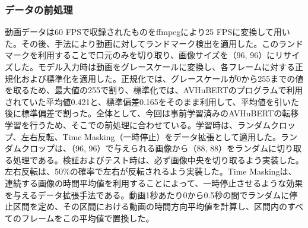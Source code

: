 \documentclass[12pt]{jarticle}
\numberwithin{equation}{section}    %
\numberwithin{figure}{section}      %
\numberwithin{table}{section}      %
\begin{document}
\begin{table}[bt]
    \centering
    \caption{利用したデータセットの文章数}
    \label{sec4:tab:dataset_info}
    \begin{center}
        \renewcommand{\arraystretch}{0.9} %
        \setlength{\tabcolsep}{8pt}      %
    \end{center}
\end{table}

\subsubsection{データの前処理}
動画データは60 FPSで収録されたものをffmpegにより25 FPSに変換して用いた。その後、手法\cite{bulat2017far}により動画に対してランドマーク検出を適用した。このランドマークを利用することで口元のみを切り取り、画像サイズを（96, 96）にリサイズした。モデル入力時は動画をグレースケールに変換し、各フレームに対する正規化および標準化を適用した。正規化では、グレースケールが0から255までの値を取るため、最大値の255で割り、標準化では、AVHuBERTのプログラムで利用されていた平均値0.421と、標準偏差0.165をそのまま利用して、平均値を引いた後に標準偏差で割った。全体として、今回は事前学習済みのAVHuBERTの転移学習を行うため、そこでの前処理に合わせている。学習時は、ランダムクロップ、左右反転、Time Masking（一時停止）をデータ拡張として適用した。ランダムクロップは、（96, 96）で与えられる画像から（88, 88）をランダムに切り取る処理である。検証およびテスト時は、必ず画像中央を切り取るよう実装した。左右反転は、50\%の確率で左右が反転されるよう実装した。Time Maskingは、連続する画像の時間平均値を利用することによって、一時停止させるような効果を与えるデータ拡張手法である。動画1秒あたり0から0.5秒の間でランダムに停止区間を定め、その区間における動画の時間方向平均値を計算し、区間内のすべてのフレームをこの平均値で置換した。
\end{document}
